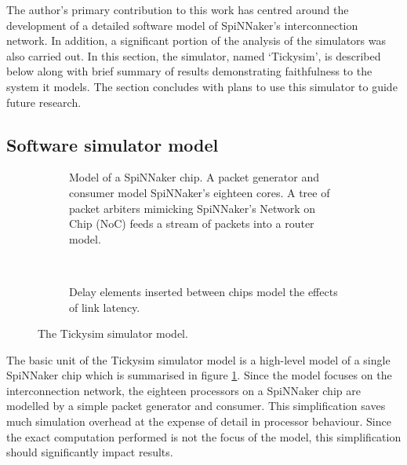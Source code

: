 		The author's primary contribution to this work has centred around the
		development of a detailed software model of SpiNNaker's interconnection
		network. In addition, a significant portion of the analysis of the
		simulators was also carried out. In this section, the simulator, named
		`Tickysim', is described below along with brief summary of results
		demonstrating faithfulness to the system it models. The section concludes
		with plans to use this simulator to guide future research.
		
		\subsection{Software simulator model}
			
			
			\begin{figure}
				\begin{subfigure}[b]{0.65\textwidth}
					\center
					\tikzexternaldisable
					
					\caption{Model of a SpiNNaker chip. A packet generator and consumer
					model SpiNNaker's eighteen cores. A tree of packet arbiters mimicking
					SpiNNaker's Network on Chip (NoC) feeds a stream of packets into a
					router model.}
					\label{fig:tickysim-model-chip}
				\end{subfigure}
				~~~~~
				\begin{subfigure}[b]{0.28\textwidth}
					\centering
					
					\vspace{1.8cm}
					
					\caption{Delay elements inserted between chips model the effects of
					link latency.}
					\label{fig:tickysim-model-link-delays}
				\end{subfigure}
				
				\caption{The Tickysim simulator model.}
				\label{fig:tickysim-model}
			\end{figure}
			
			The basic unit of the Tickysim simulator model is a high-level model of a
			single SpiNNaker chip which is summarised in figure
			\ref{fig:tickysim-model-chip}. Since the model focuses on the
			interconnection network, the eighteen processors on a SpiNNaker chip are
			modelled by a simple packet generator and consumer. This simplification
			saves much simulation overhead at the expense of detail in processor
			behaviour. Since the exact computation performed is not the focus of the
			model, this simplification should significantly impact results.
			
